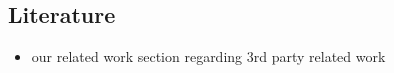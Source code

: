 \subsection{Literature}

\begin{itemize}
    \item our related work section regarding 3rd party related work 
\end{itemize}

